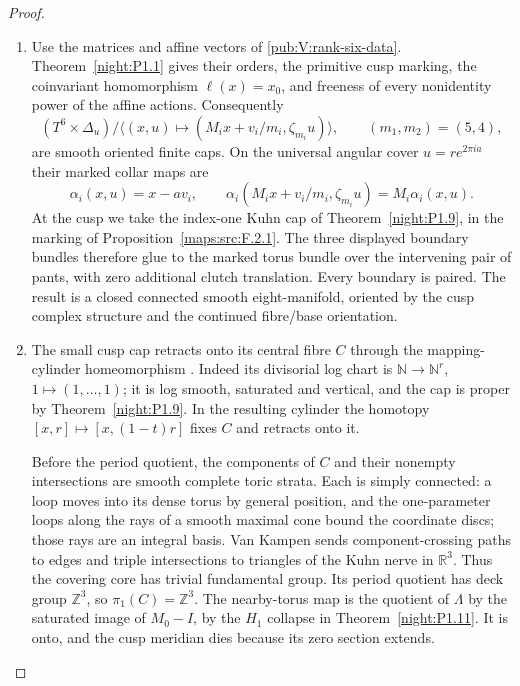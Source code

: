 \begin{proof}
\begin{enumerate}[label=\arabic*.,leftmargin=*]
\item Use the matrices and affine vectors of \cref{pub:V:rank-six-data}.
Theorem~\ref{night:P1.1} gives their orders, the primitive cusp
marking, the coinvariant homomorphism $\ell(x)=x_0$, and freeness of
every nonidentity power of the affine actions. Consequently
\[
 (T^6\times\Delta_u)/
 \langle(x,u)\mapsto(M_ix+v_i/m_i,\zeta_{m_i}u)\rangle,
 \qquad (m_1,m_2)=(5,4),
\]
are smooth oriented finite caps. On the universal angular cover
$u=r e^{2\pi ia}$ their marked collar maps are
\[
 \alpha_i(x,u)=x-av_i,
 \qquad
 \alpha_i(M_ix+v_i/m_i,\zeta_{m_i}u)=M_i\alpha_i(x,u).
\]
At the cusp we take the index-one Kuhn cap of
Theorem~\ref{night:P1.9}, in the marking of
Proposition~\ref{maps:src:F.2.1}. The three displayed boundary bundles
therefore glue to the marked torus bundle over the intervening pair
of pants, with zero additional clutch translation. Every boundary
is paired. The result is a closed connected smooth eight-manifold,
oriented by the cusp complex structure and the continued fibre/base
orientation.

\item The small cusp cap retracts onto its central fibre $C$ through
the mapping-cylinder homeomorphism
\cite[Theorem 4.1.1 and Lemmas 4.1.2--4.1.3, pp.~480--482]{ffAchingerOgus20}.
Indeed its divisorial log chart is
$\mathbb N\to\mathbb N^r$, $1\mapsto(1,\ldots,1)$; it is log smooth,
saturated and vertical, and the cap is proper by
Theorem~\ref{night:P1.9}. In the resulting cylinder the homotopy
$[x,r]\mapsto[x,(1-t)r]$ fixes $C$ and retracts onto it.

Before the period quotient, the components of $C$ and their
nonempty intersections are smooth complete toric strata. Each is
simply connected: a loop moves into its dense torus by general
position, and the one-parameter loops along the rays of a smooth
maximal cone bound the coordinate discs; those rays are an integral
basis. Van Kampen sends component-crossing paths to edges and triple
intersections to triangles of the Kuhn nerve in $\mathbb R^3$.
Thus the covering core has trivial fundamental group. Its period
quotient has deck group $\mathbb Z^3$, so $\pi_1(C)=\mathbb Z^3$.
The nearby-torus map is the quotient of $\Lambda$ by the saturated
image of $M_0-I$, by the $H_1$ collapse in
Theorem~\ref{night:P1.11}. It is onto, and the cusp meridian dies
because its zero section extends.


\end{enumerate}
\end{proof}
